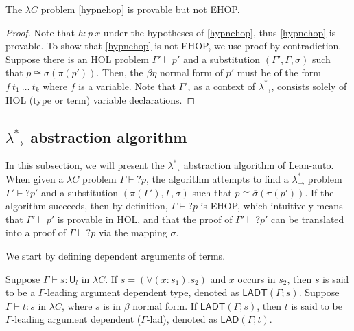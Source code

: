 \begin{theorem}
  The $\lambda C$ problem \eqref{hypnehop} is provable but not EHOP.
\end{theorem}
\begin{proof}
  Note that $h : p \ x$ under the hypotheses of \eqref{hypnehop}, thus \eqref{hypnehop} is provable.
  To show that \eqref{hypnehop} is not EHOP, we use proof by contradiction. Suppose there
  is an HOL problem $\Gamma' \vdash p'$ and a substitution $(\Gamma', \Gamma, \sigma)$ such
  that $p \cong \overline{\sigma}(\pi(p'))$. Then, the $\beta\eta$ normal form of $p'$ must be of the form
  $f \ t_1 \ \dots \ t_k$ where $f$ is a variable. Note that $\Gamma'$, as a context of $\lambda_\to^*$,
  consists solely of HOL (type or term) variable declarations.
\end{proof}

\subsection{$\lambda_\to^*$ abstraction algorithm}

In this subsection, we will present the $\lambda_\to^*$ abstraction algorithm of Lean-auto. When given a
$\lambda C$ problem $\Gamma \vdash? p$, the algorithm attempts to find a $\lambda_\to^*$
problem $\Gamma' \vdash? p'$ and a substitution $(\pi(\Gamma'), \Gamma, \sigma)$ such that
$p \cong \overline{\sigma}(\pi(p'))$. If the algorithm succeeds, then by definition, $\Gamma \vdash? p$
is EHOP, which intuitively means that $\Gamma' \vdash p'$ is provable in HOL, and that the
proof of $\Gamma' \vdash? p'$ can be translated into a proof of $\Gamma \vdash? p$ via
the mapping $\sigma$.

We start by defining dependent arguments of terms.

\begin{definition} Suppose $\Gamma \vdash s : \mathsf{U}_l$ in $\lambda C$.
  If $s = (\forall (x : s_1). s_2)$ and $x$ occurs in $s_2$,
  then $s$ is said to be a $\Gamma$-leading argument dependent type,
  denoted as $\mathsf{LADT}(\Gamma; s)$. Suppose $\Gamma \vdash t : s$ in $\lambda C$, where $s$
  is in $\beta$ normal form. If $\mathsf{LADT}(\Gamma; s)$, then $t$ is said to be
  $\Gamma$-leading argument dependent ($\Gamma$-lad), denoted as $\mathsf{LAD}(\Gamma; t)$.
\end{definition}

